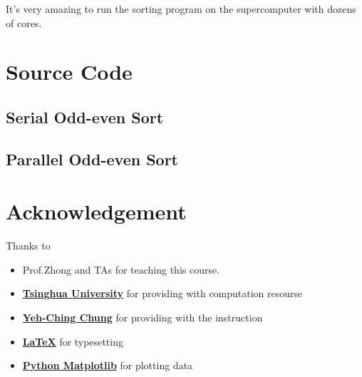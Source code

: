 \documentclass{article}
\begin{document}
	It's very amazing to run the sorting program on the supercomputer
	with dozens of cores.


\clearpage
\appendix

\section{Source Code}
	\subsection{Serial Odd-even Sort}
	\subsection{Parallel Odd-even Sort}

\section{Acknowledgement}
	Thanks to
	\begin{itemize}
		\item
			Prof.Zhong and TAs for teaching this course.
		\item
			{\bf \href{http://www.tsinghua.edu.cn/}{Tsinghua University}}
			for providing with computation resourse
		\item
			{\bf \href{http://www.cs.nthu.edu.tw/~ychung/}{Yeh-Ching Chung}}
			for providing with the instruction
		\item
			{\bf \href{http://www.latex-project.org/}{\LaTeX}}
			for typesetting
		\item
			{\bf \href{http://matplotlib.org/}{Python Matplotlib}}
			for plotting data
	\end{itemize}


\clearpage
\printbibliography
\end{document}

